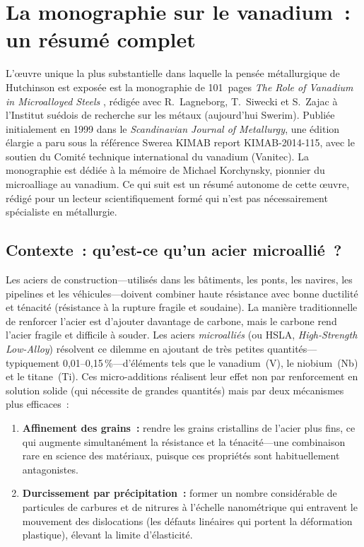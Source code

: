 \documentclass[11pt,a4paper]{article}
\begin{document}
\section{La monographie sur le vanadium~: un r\'esum\'e complet}
\label{sec:vanadium-monograph}

L'\oe uvre unique la plus substantielle dans laquelle la pens\'ee
m\'etallurgique de Hutchinson est expos\'ee est la monographie de
101~pages \emph{The Role of Vanadium in Microalloyed Steels}
\cite{Lagneborg2014}, r\'edig\'ee avec R.~Lagneborg, T.~Siwecki et
S.~Zajac \`a l'Institut su\'edois de recherche sur les m\'etaux
(aujourd'hui Swerim).  Publi\'ee initialement en 1999 dans le
\emph{Scandinavian Journal of Metallurgy}, une \'edition \'elargie a
paru sous la r\'ef\'erence Swerea KIMAB report KIMAB-2014-115, avec le
soutien du Comit\'e technique international du vanadium (Vanitec).  La
monographie est d\'edi\'ee \`a la m\'emoire de Michael Korchynsky,
pionnier du microalliage au vanadium.  Ce qui suit est un r\'esum\'e
autonome de cette \oe uvre, r\'edig\'e pour un lecteur scientifiquement
form\'e qui n'est pas n\'ecessairement sp\'ecialiste en m\'etallurgie.

\subsection{Contexte~: qu'est-ce qu'un acier microalli\'e~?}

Les aciers de construction---utilis\'es dans les b\^atiments, les ponts,
les navires, les pipelines et les v\'ehicules---doivent combiner haute
r\'esistance avec bonne ductilit\'e et t\'enacit\'e (r\'esistance \`a la
rupture fragile et soudaine).  La mani\`ere traditionnelle de renforcer
l'acier est d'ajouter davantage de carbone, mais le carbone rend l'acier
fragile et difficile \`a souder.  Les aciers \emph{microalli\'es} (ou
HSLA, \emph{High-Strength Low-Alloy}) r\'esolvent ce dilemme en ajoutant
de tr\`es petites quantit\'es---typiquement 0,01--0,15\,\%---d'\'el\'ements
tels que le vanadium~(V), le niobium~(Nb) et le titane~(Ti).  Ces
\og micro-additions \fg{} r\'ealisent leur effet non par renforcement en
solution solide (qui n\'ecessite de grandes quantit\'es) mais par deux
m\'ecanismes plus efficaces~:
\begin{enumerate}
  \item \textbf{Affinement des grains~:} rendre les grains cristallins de
    l'acier plus fins, ce qui augmente simultan\'ement la r\'esistance et
    la t\'enacit\'e---une combinaison rare en science des mat\'eriaux,
    puisque ces propri\'et\'es sont habituellement antag\-onistes.
  \item \textbf{Durcissement par pr\'ecipitation~:} former un nombre
    consid\'erable de particules de carbures et de nitrures \`a
    l'\'echelle nanom\'etrique qui entravent le mouvement des dislocations
    (les d\'efauts lin\'eaires qui portent la d\'eformation plastique),
    \'elevant la limite d'\'elasticit\'e.
\end{enumerate}
\end{document}
